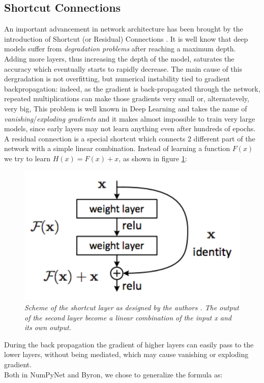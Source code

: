 \documentclass[12pt,a4paper]{report}
\begin{document}
\subsection*{Shortcut Connections}

An important advancement in network architecture has been brought by the introduction of Shortcut (or Residual) Connections \cite{residual}. It is well know that deep models suffer from {\it degradation problems} after reaching a maximum depth. Adding more layers, thus increasing the depth of the model, saturates the accuracy which eventually starts to rapidly decrease. 
The main cause of this dergradation is not overfitting, but numerical instability tied to gradient backpropagation: indeed, as the gradient is back-propagated through the network, repeated multiplications can make those gradients very small or, alternatevely, very big,
This problem is well known in Deep Learning and takes the name of {\it vanishing}/{\it exploding gradients} and it makes almost impossible to train very large models, since early layers may not learn anything even after hundreds of epochs.
A residual connection is a special shortcut which connects 2 different part of the network with a simple linear combination.
Instead of learning a function $F(x)$ we try to learn $H(x) = F(x) + x$, as shown in figure \ref{fig:shortcut}:

\begin{figure}[h]
 \centering
 \includegraphics[scale=0.4]{./images/shortcut.png}
 \caption{\it Scheme of the shortcut layer as designed by the authors \cite{residual}. The output of the second layer become a linear combination of the input x and its own output.}
 \label{fig:shortcut}
\end{figure}
During the back propagation the gradient of higher layers can easily pass to the lower layers, without being mediated, which may cause vanishing or exploding gradient.
\\
Both in NumPyNet and Byron, we chose to generalize the formula as: 
\end{document}
